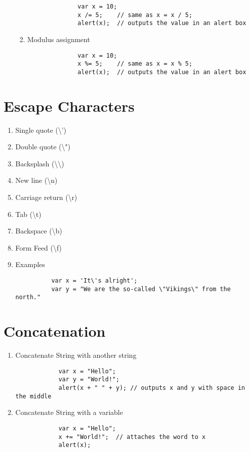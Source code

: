 \documentclass{article}
\begin{document}
\begin{enumerate}
\begin{enumerate}
            \begin{lstlisting}
              var x = 10;
              x /= 5;    // same as x = x / 5;
              alert(x);  // outputs the value in an alert box
            \end{lstlisting}
          \item Modulus assignment
            \begin{lstlisting}
              var x = 10;
              x %= 5;    // same as x = x % 5;
              alert(x);  // outputs the value in an alert box
            \end{lstlisting}
        \end{enumerate}
      \end{enumerate}
  \section{Escape Characters}
    \begin{enumerate}
      \item Single quote (\textbackslash')
      \item Double quote (\textbackslash")
      \item Backsplash (\textbackslash\textbackslash)
      \item New line (\textbackslash n)
      \item Carriage return (\textbackslash r)
      \item Tab (\textbackslash t)
      \item Backspace (\textbackslash b)
      \item Form Feed (\textbackslash f)
      \item Examples
        \begin{lstlisting}
          var x = 'It\'s alright';
          var y = "We are the so-called \"Vikings\" from the north."
        \end{lstlisting}
    \end{enumerate}
  \section{Concatenation}
      \begin{enumerate}
        \item Concatenate String with another string
          \begin{lstlisting}
            var x = "Hello";
            var y = "World!";
            alert(x + " " + y); // outputs x and y with space in the middle
          \end{lstlisting}
        \item Concatenate String with a variable
          \begin{lstlisting}
            var x = "Hello";
            x += "World!";  // attaches the word to x
            alert(x);
          \end{lstlisting}
      \end{enumerate}
\end{document}
